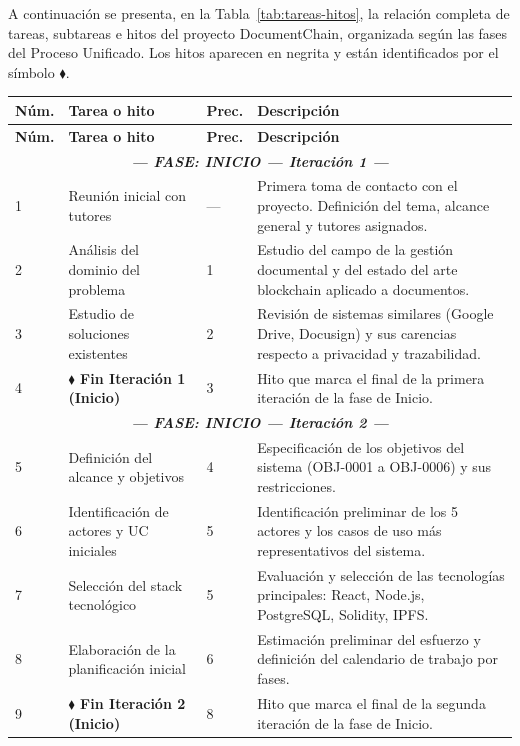 \documentclass[11pt, a4paper]{article}
\begin{document}
A continuación se presenta, en la Tabla~\ref{tab:tareas-hitos}, la relación completa de tareas, subtareas e hitos del proyecto DocumentChain, organizada según las fases del Proceso Unificado. Los hitos aparecen en negrita y están identificados por el símbolo $\blacklozenge$.

\begin{longtable}{|p{1cm}|p{5.5cm}|p{1.5cm}|p{5.5cm}|}
\hline
\textbf{Núm.} & \textbf{Tarea o hito} & \textbf{Prec.} & \textbf{Descripción} \\
\hline
\endfirsthead
\hline
\textbf{Núm.} & \textbf{Tarea o hito} & \textbf{Prec.} & \textbf{Descripción} \\
\hline
\endhead
\multicolumn{4}{|c|}{\textit{\textbf{--- FASE: INICIO --- Iteración 1 ---}}} \\
\hline
1 & Reunión inicial con tutores & --- & Primera toma de contacto con el proyecto. Definición del tema, alcance general y tutores asignados. \\
\hline
2 & Análisis del dominio del problema & 1 & Estudio del campo de la gestión documental y del estado del arte blockchain aplicado a documentos. \\
\hline
3 & Estudio de soluciones existentes & 2 & Revisión de sistemas similares (Google Drive, Docusign) y sus carencias respecto a privacidad y trazabilidad. \\
\hline
4 & \textbf{$\blacklozenge$ Fin Iteración 1 (Inicio)} & 3 & Hito que marca el final de la primera iteración de la fase de Inicio. \\
\hline
\multicolumn{4}{|c|}{\textit{\textbf{--- FASE: INICIO --- Iteración 2 ---}}} \\
\hline
5 & Definición del alcance y objetivos & 4 & Especificación de los objetivos del sistema (OBJ-0001 a OBJ-0006) y sus restricciones. \\
\hline
6 & Identificación de actores y UC iniciales & 5 & Identificación preliminar de los 5 actores y los casos de uso más representativos del sistema. \\
\hline
7 & Selección del stack tecnológico & 5 & Evaluación y selección de las tecnologías principales: React, Node.js, PostgreSQL, Solidity, IPFS. \\
\hline
8 & Elaboración de la planificación inicial & 6 & Estimación preliminar del esfuerzo y definición del calendario de trabajo por fases. \\
\hline
9 & \textbf{$\blacklozenge$ Fin Iteración 2 (Inicio)} & 8 & Hito que marca el final de la segunda iteración de la fase de Inicio. \\

\end{longtable}
\end{document}
